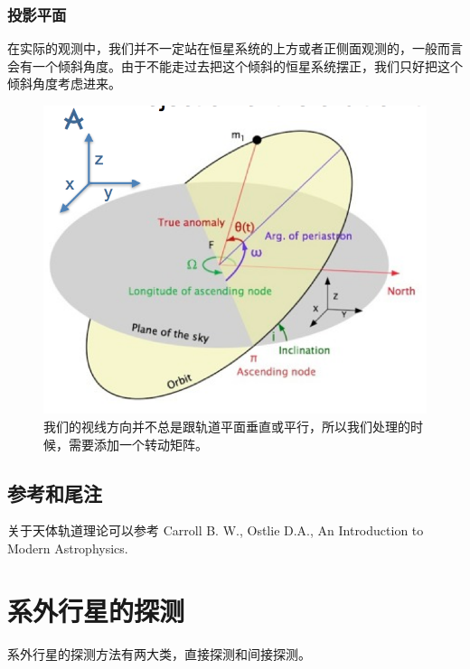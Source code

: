 \documentclass[letterpaper,10pt,english]{sphinxmanual}
\begin{document}
\subsubsection{投影平面}
\label{orbits:id15}
在实际的观测中，我们并不一定站在恒星系统的上方或者正侧面观测的，一般而言会有一个倾斜角度。由于不能走过去把这个倾斜的恒星系统摆正，我们只好把这个倾斜角度考虑进来。
\begin{figure}[htbp]
\centering
\capstart

\includegraphics{tiltedOrbitPlane.png}
\caption{我们的视线方向并不总是跟轨道平面垂直或平行，所以我们处理的时候，需要添加一个转动矩阵。}\end{figure}


\subsection{参考和尾注}
\label{orbits:id16}
关于天体轨道理论可以参考 Carroll B. W., Ostlie D.A., An Introduction to Modern Astrophysics.


\section{系外行星的探测}
\label{detection::doc}\label{detection:id1}
系外行星的探测方法有两大类，直接探测和间接探测。

\end{document}
